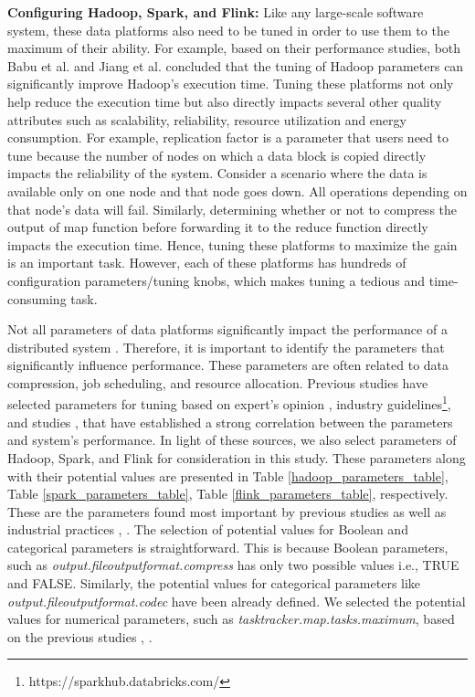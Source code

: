 \documentclass[3p]{elsarticle}
\begin{document}
\textbf{Configuring Hadoop, Spark, and Flink:} Like any large-scale software system, these data platforms also need to be tuned in order to use them to the maximum of their ability. For example, based on their performance studies, both Babu et al. \cite{babu2010towards} and Jiang et al. \cite{jiang2010performance} concluded that the tuning of Hadoop parameters can significantly improve Hadoop's execution time. Tuning these platforms not only help reduce the execution time but also directly impacts several other quality attributes such as scalability, reliability, resource utilization and energy consumption. For example, replication factor is a parameter that users need to tune because the number of nodes on which a data block is copied directly impacts the reliability of the system. Consider a scenario where the data is available only on one node and that node goes down. All operations depending on that node's data will fail. Similarly, determining whether or not to compress the output of map function before forwarding it to the reduce function directly impacts the execution time. Hence, tuning these platforms to maximize the gain is an important task. However, each of these platforms has hundreds of configuration parameters/tuning knobs, which makes tuning a tedious and time-consuming task. 

Not all parameters of data platforms significantly impact the performance of a distributed system \cite{herodotou2020survey}. Therefore, it is important to identify the parameters that significantly influence performance. These parameters are often related to data compression, job scheduling, and resource allocation. Previous studies have selected parameters for tuning based on expert's opinion \cite{wang2016novel}, industry guidelines\footnote{https://sparkhub.databricks.com/}, and studies \cite{vaquero2018auto}, \cite{ yang2012statistics} that have established a strong correlation between the parameters and system's performance. In light of these sources, we also select parameters of Hadoop, Spark, and Flink for consideration in this study. These parameters along with their potential values are presented in Table \ref{hadoop_parameters_table}, Table \ref{spark_parameters_table}, Table \ref{flink_parameters_table}, respectively. These are the parameters found most important by previous studies as well as industrial practices \cite{herodotou2020survey}, \cite{costa2021survey}. The selection of potential values for Boolean and categorical parameters is straightforward. This is because Boolean parameters, such as \textit{output.fileoutputformat.compress} has only two possible values i.e., TRUE and FALSE. Similarly, the potential values for categorical parameters like \textit{output.fileoutputformat.codec} have been already defined. We selected the potential values for numerical parameters, such as \textit{tasktracker.map.tasks.maximum}, based on the previous studies \cite{herodotou2020survey}, \cite{costa2021survey}.  
\end{document}
